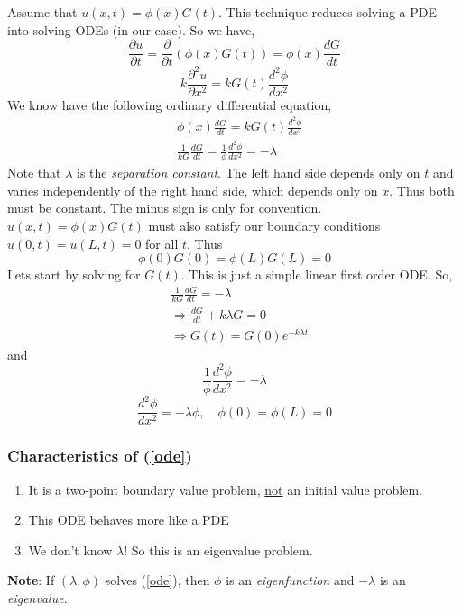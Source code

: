 \documentclass{article}
\begin{document}
	Assume that $ u(x,t) = \phi(x) G(t) $. This technique reduces solving a PDE into solving ODEs (in our case). So we have,
	\[
		\frac{\partial u}{\partial t} = \frac{\partial}{\partial t} (\phi(x) G(t)) = \phi(x) \frac{dG}{dt}
	\]
	\[
		k\frac{\partial^2 u}{\partial x^2} = kG(t) \frac{d^2\phi}{dx^2}
	\]
	We know have the following ordinary differential equation,
	\begin{align*}
		&\phi(x) \frac{dG}{dt} = kG(t)\frac{d^2\phi}{dx^2} \\
		&\frac{1}{kG} \frac{dG}{dt} = \frac{1}{\phi}\frac{d^2\phi}{dx^2} = -\lambda
	\end{align*}
	Note that $ \lambda $ is the \textit{separation constant}. The left hand side depends only on $ t $ and varies independently of the right hand side, which depends only on $ x $. Thus both must be constant. The minus sign is only for convention. \\
	
	$ u(x,t) = \phi(x) G(t) $ must also satisfy our boundary conditions $ u(0,t) = u(L,t) = 0 $ for all $ t $. Thus
	\[
		\phi(0)G(0) = \phi(L)G(L) = 0
	\]
	Lets start by solving for $ G(t) $. This is just a simple linear first order ODE. So,
	\begin{align*}
		&\frac{1}{kG} \frac{dG}{dt} = -\lambda \\
		&\Rightarrow \frac{dG}{dt} + k\lambda G = 0\\
		&\Rightarrow G(t) = G(0)e^{-k\lambda t} 
	\end{align*}
	and
	\[
		\frac{1}{\phi} \frac{d^2\phi}{dx^2} = -\lambda
	\]
	\begin{equation}\label{ode}
		\frac{d^2\phi}{dx^2} = -\lambda\phi, \quad \phi(0)=\phi(L)=0
	\end{equation}
	
	\subsubsection*{Characteristics of (\ref{ode})} 
	\begin{enumerate}[label=\arabic*.)]
		\item It is a two-point boundary value problem, \underline{not} an initial value problem.
		\item This ODE behaves more like a PDE
		\item We don't know $ \lambda $! So this is an eigenvalue problem.
	\end{enumerate}
	
	\textbf{Note}: If $ (\lambda, \phi) $ solves (\ref{ode}), then $ \phi $ is an \textit{eigenfunction} and $ -\lambda $ is an \textit{eigenvalue}. \\
	
\end{document}
